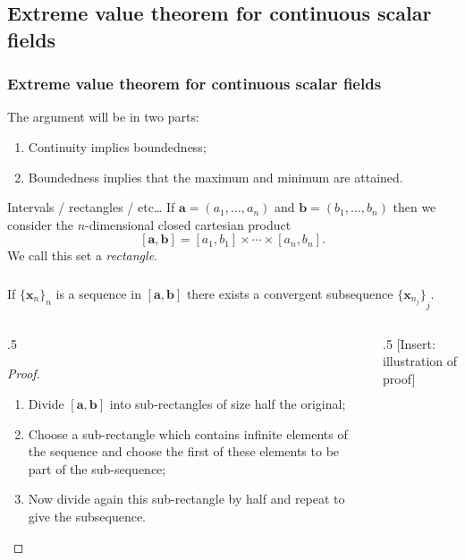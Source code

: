 \documentclass[aspectratio=169,handout]{beamer}
\renewcommand{\aa}{\mathbf{a}}
\newcommand{\bb}{\mathbf{b}}
\newcommand{\xx}{\mathbf{x}}
\begin{document}
\subsection{Extreme value theorem for continuous scalar fields}

\begin{frame}
    \frametitle{Extreme value theorem for continuous scalar fields}

    The argument will be in two parts:
    \begin{enumerate}
        \item Continuity implies boundedness;
        \item Boundedness implies that the maximum and minimum are attained.
    \end{enumerate}

    Intervals / rectangles / etc\ldots
    If \(\aa = (a_1,\ldots,a_n)\) and  \(\bb = (b_1,\ldots,b_n)\)
    then we consider the \(n\)-dimensional closed cartesian product
    \[
        [\aa,\bb] = [a_1,b_1] \times \cdots \times [a_n,b_n].
    \]
    We call this set a \emph{rectangle}.

\end{frame}

\begin{frame}
    \frametitle{}

    \begin{theorem}
        If \({\{\xx_{n}\}}_{n}\) is a sequence in \( [\aa,\bb]\)
        there exists a convergent subsequence \({\{\xx_{n_j}\}}_{j}\).
    \end{theorem}

    \begin{columns}

        \begin{column}{.5\textwidth}
            \begin{proof}
                \begin{enumerate}
                    \item Divide \( [\aa,\bb]\) into sub-rectangles of size half the original;
                    \item Choose a sub-rectangle which contains infinite elements of the sequence and choose the first of these elements to be part of the sub-sequence;
                    \item Now divide again this sub-rectangle by half and repeat to give the subsequence.
                \end{enumerate}
            \end{proof}
        \end{column}

        \begin{column}{.5\textwidth}
            [Insert: illustration of proof]
        \end{column}
    \end{columns}

\end{frame}
\end{document}

